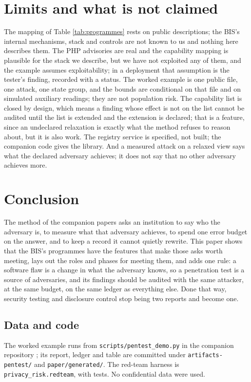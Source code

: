 \documentclass[11pt,a4paper]{article}
\begin{document}
\section{Limits and what is not claimed}\label{sec:limits}
The mapping of Table \ref{tab:programmes} rests on public descriptions; the BIS's internal mechanisms, stack and controls are not known to us and nothing here describes them. The PHP advisories are real and the capability mapping is plausible for the stack we describe, but we have not exploited any of them, and the example assumes exploitability; in a deployment that assumption is the tester's finding, recorded with a status. The worked example is one public file, one attack, one state group, and the bounds are conditional on that file and on simulated auxiliary readings; they are not population risk. The capability list is closed by design, which means a finding whose effect is not on the list cannot be audited until the list is extended and the extension is declared; that is a feature, since an undeclared relaxation is exactly what the method refuses to reason about, but it is also work. The registry service is specified, not built; the companion code gives the library. And a measured attack on a relaxed view says what the declared adversary achieves; it does not say that no other adversary achieves more.

\section{Conclusion}
The method of the companion papers asks an institution to say who the adversary is, to measure what that adversary achieves, to spend one error budget on the answer, and to keep a record it cannot quietly rewrite. This paper shows that the BIS's programmes have the features that make those asks worth meeting, lays out the roles and phases for meeting them, and adds one rule: a software flaw is a change in what the adversary knows, so a penetration test is a source of adversaries, and its findings should be audited with the same attacker, at the same budget, on the same ledger as everything else. Done that way, security testing and disclosure control stop being two reports and become one.

\subsection*{Data and code}
The worked example runs from \texttt{scripts/pentest\_demo.py} in the companion repository \citep{privacyriskcode}; its report, ledger and table are committed under \texttt{artifacts-pentest/} and \texttt{paper/generated/}. The red-team harness is \texttt{privacy\_risk.redteam}, with tests. No confidential data were used.
\end{document}
